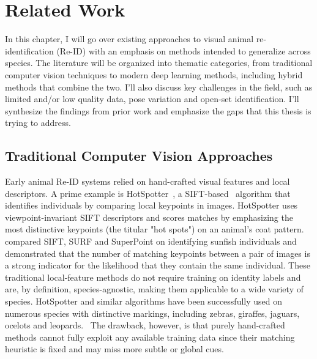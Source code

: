 \chapter{Related Work}
\label{chap:related_work}
In this chapter, I will go over existing approaches to visual animal re-identification (Re-ID) with an emphasis on methods intended to generalize across species. The literature will be organized into thematic categories, from traditional computer vision techniques to modern deep learning methods, including hybrid methods that combine the two. I'll also discuss key challenges in the field, such as limited and/or low quality data, pose variation and open-set identification. I'll synthesize the findings from prior work and emphasize the gaps that this thesis is trying to address.

\section{Traditional Computer Vision Approaches}
Early animal Re-ID systems relied on hand-crafted visual features and local descriptors. A prime example is HotSpotter~\cite{6475023}, a SIFT-based~\cite{Lowe2004SIFT} algorithm that identifies individuals by comparing local keypoints in images. HotSpotter uses viewpoint-invariant SIFT descriptors and scores matches by emphasizing the most distinctive keypoints (the titular "hot spots") on an animal's coat pattern. ~\cite{jmse11050889} compared SIFT, SURF and SuperPoint on identifying sunfish individuals and demonstrated that the number of matching keypoints between a pair of images is a strong indicator for the likelihood that they contain the same individual. These traditional local-feature methods do not require training on identity labels and are, by definition, species-agnostic, making them applicable to a wide variety of species. HotSpotter and similar algorithms have been successfully used on numerous species with distinctive markings, including zebras, giraffes, jaguars, ocelots and leopards.~\cite{springerSpeciesAgnosticPatterned} The drawback, however, is that purely hand-crafted methods cannot fully exploit any available training data since their matching heuristic is fixed and may miss more subtle or global cues. 

